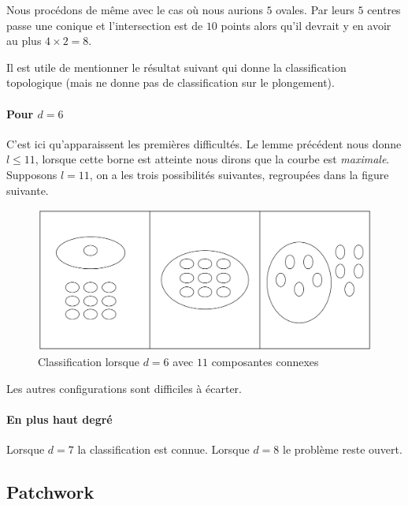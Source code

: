 \documentclass{livre}
\begin{document}
Nous procédons de même avec le cas où nous aurions $5$ ovales. Par leurs $5$ centres passe une conique et l'intersection est de $10$ points alors qu'il devrait y en avoir au plus $4\times 2 = 8$.

Il est utile de mentionner le résultat suivant qui donne la classification topologique (mais ne donne pas de classification sur le plongement).

\paragraph{Pour $d=6$}C'est ici qu'apparaissent les premières difficultés. Le lemme précédent nous donne $l\leq 11$, lorsque cette borne est atteinte nous dirons que la courbe est \textit{maximale}. Supposons $l=11$, on a les trois possibilités suivantes, regroupées dans la figure suivante.

\begin{figure}[H]
\begin{center}
\includegraphics[scale=0.4]{Figures/fig4}
\end{center}
\caption{Classification lorsque $d=6$ avec $11$ composantes connexes}
\end{figure}
Les autres configurations sont difficiles à écarter.

\paragraph{En plus haut degré}Lorsque $d=7$ la classification est connue. Lorsque $d=8$ le problème reste ouvert.

\subsection*{Patchwork}
\end{document}
